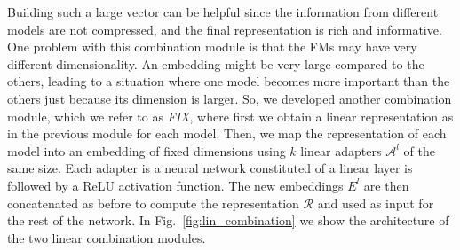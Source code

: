 Building such a large vector can be helpful since the information from different models are not compressed, and the final representation is rich and informative.
One problem with this combination module is that the FMs may have very different dimensionality.
An embedding might be very large compared to the others, leading to a situation where one model becomes more important than the others just because its dimension is larger.
So, we developed another combination module, which we refer to as \textit{FIX}, where first we obtain a linear representation as in the previous module for each model.
Then, we map the representation of each model into an embedding of fixed dimensions using $k$ linear adapters $\mathcal{A}^{l}$ of the same size.
Each adapter is a neural network constituted of a linear layer is followed by a ReLU activation function.
The new embeddings $E^{l}$ are then concatenated as before to compute the representation $\mathcal{R}$ and used as input for the rest of the network.
In Fig.~\ref{fig:lin_combination} we show the architecture of the two linear combination modules.


